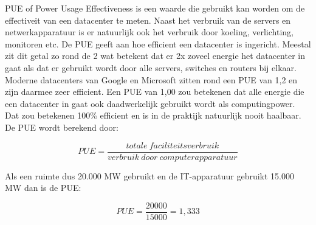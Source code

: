 PUE of Power Usage Effectiveness is een waarde die gebruikt kan worden om de effectiveit van een datacenter te meten. Naast het verbruik van de servers en netwerkapparatuur is er natuurlijk ook het verbruik door koeling, verlichting, monitoren etc. De PUE geeft aan hoe efficient een datacenter is ingericht. Meestal zit dit getal zo rond de 2 wat betekent dat er 2x zoveel energie het datacenter in gaat als dat er gebruikt wordt door alle servers, switches en routers bij elkaar. Moderne datacenters van Google en Microsoft zitten rond een PUE van 1,2 en zijn daarmee zeer efficient. Een PUE van 1,00 zou betekenen dat alle energie die een datacenter in gaat ook daadwerkelijk gebruikt wordt als computingpower. Dat zou betekenen 100\% efficient en is in de praktijk natuurlijk nooit haalbaar. De PUE wordt berekend door:

\begin{equation}
PUE = \frac{totale\ faciliteitsverbruik}{verbruik\ door\ computerapparatuur}
\end{equation}

Als een ruimte dus 20.000 MW gebruikt en de IT-apparatuur gebruikt 15.000 MW dan is de PUE:

\begin{equation}
PUE = \frac{20000}{15000} = 1,333
\end{equation}

